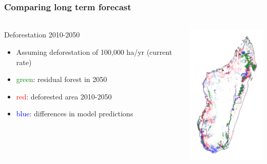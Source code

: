 \documentclass[slidetop,10pt,dvipsnames,leqno,fleqn]{beamer} %
\begin{document}
\begin{frame}
  \frametitle{Comparing long term forecast}
  \framesubtitle{}
  \begin{columns}
    \begin{column}{0.5\textwidth}
      \begin{block}{Deforestation 2010-2050}
        \begin{itemize}
        \item Assuming deforestation of 100,000 ha/yr (current rate)
        \item \textcolor{green}{green}: residual forest in 2050
        \item \textcolor{red}{red}: deforested area 2010-2050
        \item \textcolor{blue}{blue}: differences in model predictions
        \end{itemize}
      \end{block}
    \end{column}
    \begin{column}{0.5\textwidth}
      \centering \includegraphics[width=4cm]{./Figures/diff_iCAR_nsre_2050.png}
    \end{column}
  \end{columns}
\end{frame}
\end{document}
